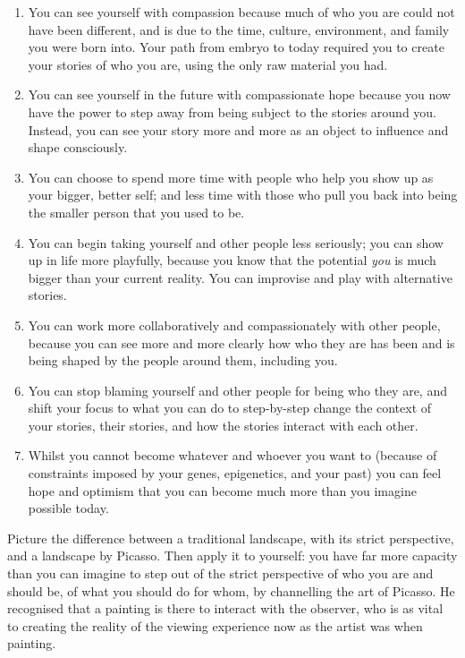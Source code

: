 \begin{enumerate}
\item You can see yourself with compassion because much of who you are could not have been different, and is due to the time, culture, environment, and family you were born into. Your path from embryo to today required you to create your stories of who you are, using the only raw material you had.
\item You can see yourself in the future with compassionate hope because you now have the power to step away from being subject to the stories around you. Instead, you can see your story more and more as an object to influence and shape consciously.
\item You can choose to spend more time with people who help you show up as your bigger, better self; and less time with those who pull you back into being the smaller person that you used to be.
\item You can begin taking yourself and other people less seriously; you can show up in life more playfully, because you know that the potential \emph{you} is much bigger than your current reality. You can improvise and play with alternative stories.
\item You can work more collaboratively and compassionately with other people, because you can see more and more clearly how who they are has been and is being shaped by the people around them, including you. 
\item You can stop blaming yourself and other people for being who they are, and shift your focus to what you can do to step-by-step change the context of your stories, their stories, and how the stories interact with each other.
\item Whilst you cannot become whatever and whoever you want to (because of constraints imposed by your genes, epigenetics, and your past) you can feel hope and optimism that you can become much more than you imagine possible today. 
\end{enumerate}


Picture the difference between a traditional landscape, with its strict perspective, and a landscape by Picasso. Then apply it to yourself: you have far more capacity than you can imagine to step out of the strict perspective of who you are and should be, of what you should do for whom, by channelling the art of Picasso. He recognised that a painting is there to interact with the observer, who is as vital to creating the reality of the viewing experience now as the artist was when painting. 


